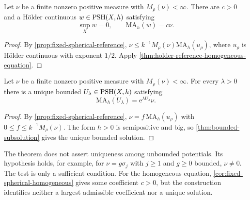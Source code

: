 \begin{corollary}\label{cor:fixed-spherical-homogeneous}
Let $\nu$ be a finite nonzero positive measure with $M_\rho(\nu)<\infty$. There are $c>0$ and a H\"older continuous $w\in\mathrm{PSH}(X,h)$ satisfying
\[
 \sup_Xw=0,\qquad\mathrm{MA}_h(w)=c\nu.
\]
\end{corollary}
\begin{proof}
By \cref{prop:fixed-spherical-reference}, $\nu\leq k^{-1}M_\rho(\nu)\mathrm{MA}_h(u_\rho)$, where $u_\rho$ is H\"older continuous with exponent $1/2$. Apply \cref{thm:holder-reference-homogeneous-equation}.
\end{proof}

\begin{theorem}\label{thm:fixed-spherical-exponential}
Let $\nu$ be a finite nonzero positive measure with $M_\rho(\nu)<\infty$. For every $\lambda>0$ there is a unique bounded $U_\lambda\in\mathrm{PSH}(X,h)$ satisfying
\[
 \mathrm{MA}_h(U_\lambda)=\mathrm e^{\lambda U_\lambda}\nu.
\]
\end{theorem}
\begin{proof}
By \cref{prop:fixed-spherical-reference}, $\nu=f\,\mathrm{MA}_h(u_\rho)$ with $0\leq f\leq k^{-1}M_\rho(\nu)$. The form $h>0$ is semipositive and big, so \cref{thm:bounded-subsolution} gives the unique bounded solution.
\end{proof}

The theorem does not assert uniqueness among unbounded potentials. Its hypothesis holds, for example, for $\nu=g\sigma_j$ with $j\geq1$ and $g\geq0$ bounded, $\nu\neq0$. The test is only a sufficient condition. For the homogeneous equation, \cref{cor:fixed-spherical-homogeneous} gives some coefficient $c>0$, but the construction identifies neither a largest admissible coefficient nor a unique solution.
